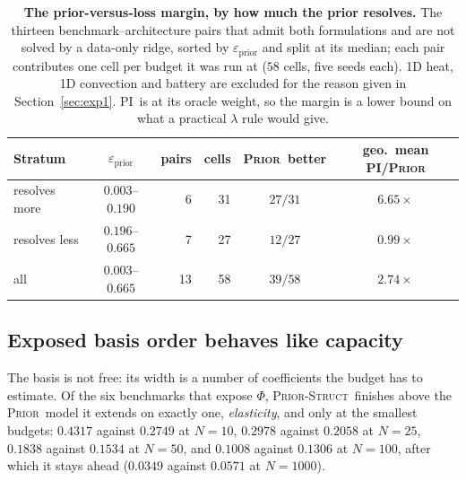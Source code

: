 \documentclass{article}
\newcommand{\armpi}{\textsc{PI}}
\newcommand{\armprior}{\textsc{Prior}}
\newcommand{\armstruct}{\textsc{Prior-Struct}}
\begin{document}
\begin{table}[t]
\centering
\footnotesize
\setlength{\tabcolsep}{16pt}
\renewcommand{\arraystretch}{0.7}
\caption{\textbf{The prior-versus-loss margin, by how much the prior resolves.} The thirteen
benchmark--architecture pairs that admit both formulations and are not solved by a data-only
ridge, sorted by $\varepsilon_{\mathrm{prior}}$ and split at its median; each pair contributes one
cell per budget it was run at ($58$ cells, five seeds each). 1D heat, 1D convection and battery
are excluded for the reason given in Section~\ref{sec:exp1}. \armpi\ is at its oracle weight, so
the margin is a lower bound on what a practical $\lambda$ rule would give.}
\label{tab:strata}
\vspace{1mm}
\begin{tabular}{@{}lcrrcc@{}}
\toprule
Stratum & $\varepsilon_{\mathrm{prior}}$ & pairs & cells & \armprior\ better & geo.\ mean \armpi/\armprior \\
\midrule
resolves more  & $0.003$--$0.190$ & 6 & 31 & $27/31$ & $6.65\times$ \\
resolves less  & $0.196$--$0.665$ & 7 & 27 & $12/27$ & $0.99\times$ \\
\midrule
all            & $0.003$--$0.665$ & 13 & 58 & $39/58$ & $2.74\times$ \\
\bottomrule
\end{tabular}
  \vspace{-3mm}
\end{table}




\subsection{Exposed basis order behaves like capacity}

\label{app:kmax}

The basis is not free: its width is a number of coefficients the budget has to estimate. Of the
six benchmarks that expose $\Phi$, \armstruct\ finishes above the \armprior\ model it extends
on exactly one, \emph{elasticity}, and only at the smallest budgets: $0.4317$ against $0.2749$
at $N{=}10$, $0.2978$ against $0.2058$ at $N{=}25$, $0.1838$ against $0.1534$ at $N{=}50$, and
$0.1008$ against $0.1306$ at $N{=}100$, after which it stays ahead ($0.0349$ against $0.0571$ at
$N{=}1000$).
\end{document}
